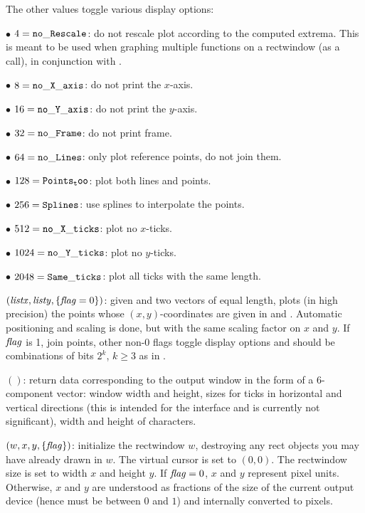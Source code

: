 The other values toggle various display options:

$\bullet$ $4 = {\tt no\_Rescale}$: do not rescale plot according to the
computed extrema. This is meant to be used when graphing multiple functions
on a rectwindow (as a  call), in conjunction with
.

$\bullet$ $8 = {\tt no\_X\_axis}$: do not print the $x$-axis.

$\bullet$ $16 = {\tt no\_Y\_axis}$: do not print the $y$-axis.

$\bullet$ $32 = {\tt no\_Frame}$: do not print frame.

$\bullet$ $64 = {\tt no\_Lines}$: only plot reference points, do not join them.

$\bullet$ $128 = {\tt Points_too}$: plot both lines and points.

$\bullet$ $256 = {\tt Splines}$: use splines to interpolate the points.

$\bullet$ $512 = {\tt no\_X\_ticks}$: plot no $x$-ticks.

$\bullet$ $1024 = {\tt no\_Y\_ticks}$: plot no $y$-ticks.

$\bullet$ $2048 = {\tt Same\_ticks}$: plot all ticks with the same length.

$(\hbox{\it listx\/},\hbox{\it listy\/},\{\hbox{\it f\kern0pt lag\/}=0\})$: given
 and  two vectors of equal length, plots (in high
precision) the points whose $(x,y)$-coordinates are given in 
and . Automatic positioning and scaling is done, but with the
same scaling factor on $x$ and $y$. If $\hbox{\it f\kern0pt lag\/}$ is 1, join points, other non-0
flags toggle display options and should be combinations of bits $2^k$, $k
\geq 3$ as in .

$()$: return data corresponding to the output window
in the form of a 6-component vector: window width and height, sizes for ticks
in horizontal and vertical directions (this is intended for the 
interface and is currently not significant), width and height of characters.

$(w,x,y,\{\hbox{\it f\kern0pt lag\/}\})$: initialize the rectwindow $w$,
destroying any rect objects you may have already drawn in $w$. The virtual
cursor is set to $(0,0)$. The rectwindow size is set to width $x$ and height
$y$. If $\hbox{\it f\kern0pt lag\/}=0$, $x$ and $y$ represent pixel units. Otherwise, $x$ and $y$
are understood as fractions of the size of the current output device (hence
must be between $0$ and $1$) and internally converted to pixels.

